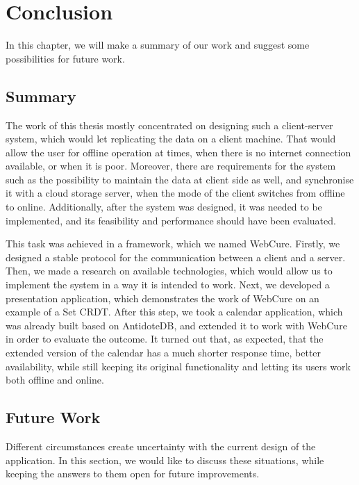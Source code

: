 \chapter{Conclusion}
\label{Conclusion}

In this chapter, we will make a summary of our work and suggest some possibilities for future work.

\section{Summary}
\label{summary}

The work of this thesis mostly concentrated on designing such a client-server system, which would let replicating the data on a client machine. That would allow the user for offline operation at times, when there is no internet connection available, or when it is poor. Moreover, there are requirements for the system such as the possibility to maintain the data at client side as well, and synchronise it with a cloud storage server, when the mode of the client switches from offline to online. Additionally, after the system was designed, it was needed to be implemented, and its feasibility and performance should have been evaluated.

This task was achieved in a framework, which we named WebCure. Firstly, we designed a stable protocol for the communication between a client and a server. Then, we made a research on available technologies, which would allow us to implement the system in a way it is intended to work. Next, we developed a presentation application, which demonstrates the work of WebCure on an example of a Set CRDT. After this step, we took a calendar application, which was already built based on AntidoteDB, and extended it to work with WebCure in order to evaluate the outcome. It turned out that, as expected, that the extended version of the calendar has a much shorter response time, better availability, while still keeping its original functionality and letting its users work both offline and online. 

\section{Future Work}
\label{futurework}

Different circumstances create uncertainty with the current design of the application. In this section, we would like to discuss these situations, while keeping the answers to them open for future improvements.

